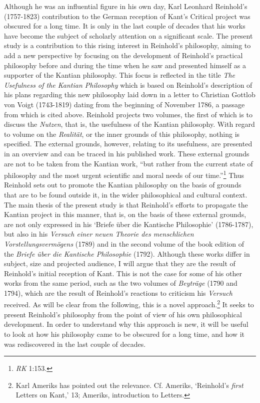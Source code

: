 Although he was an influential figure in his own day, Karl Leonhard Reinhold's (1757{-}1823) contribution to the German reception of Kant's Critical project was obscured for a long time. It is only in the last couple of decades that his works have become the subject of scholarly attention on a significant scale. The present study is a contribution to this rising interest in Reinhold's philosophy, aiming to add a new perspective by focusing on the development of Reinhold's practical philosophy before and during the time when he saw and presented himself as a supporter of the Kantian philosophy. This focus is reflected in the title \textit{The Usefulness of the Kantian Philosophy} which is based on Reinhold's description of his plans regarding this new philosophy laid down in a letter to Christian Gottlob von Voigt (1743{-}1819) dating from the beginning of November 1786, a passage from which is cited above. Reinhold projects two volumes, the first of which is to discuss the \textit{Nutzen}, that is, the usefulness of the Kantian philosophy. With regard to volume on the \textit{Realit\"{a}t}, or the inner grounds of this philosophy, nothing is specified. The external grounds, however, relating to its usefulness, are presented in an overview and can be traced in his published work. These external grounds are not to be taken from the Kantian work, ``but rather from the current state of philosophy and the most urgent scientific and moral needs of our time.''\footnote{ \textit{RK} 1:153.} Thus Reinhold sets out to promote the Kantian philosophy on the basis of grounds that are to be found outside it, in the wider philosophical and cultural context.  The main thesis of the present study is that Reinhold's efforts to propagate the Kantian project in this manner, that is, on the basis of these external grounds, are not only expressed in his `Briefe \"{u}ber die Kantische Philosophie' (1786{-}1787), but also in his \textit{Versuch einer neuen Theorie des menschlichen Vorstellungsverm\"{o}gens} (1789) and in the second volume of the book edition of the \textit{Briefe \"{u}ber die Kantische Philosophie }(1792). Although these works differ in subject, size and projected audience, I will argue that they are the result of Reinhold's initial reception of Kant. This is not the case for some of his other works from the same period, such as the two volumes of \textit{Beytr\"{a}ge} (1790 and 1794), which are the result of Reinhold's reactions to criticism his \textit{Versuch} received. As will be clear from the following, this is a novel approach.\footnote{ Karl Ameriks has pointed out the relevance. Cf. Ameriks, `Reinhold's \textit{first }Letters on Kant,' 13; Ameriks, introduction to Letters. } It seeks to present Reinhold's philosophy from the point of view of his own philosophical development. In order to understand why this approach is new, it will be useful to look at how his philosophy came to be obscured for a long time, and how it was rediscovered in the last couple of decades. 


